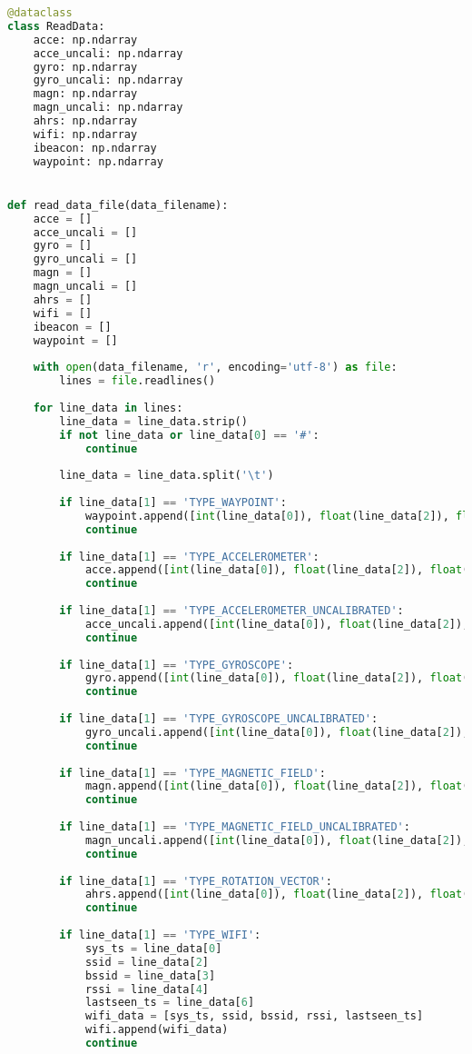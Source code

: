 \documentclass{article}
\begin{document}
\begin{latin}
\begin{lstlisting}[language=Python]
@dataclass
class ReadData:
	acce: np.ndarray
	acce_uncali: np.ndarray
	gyro: np.ndarray
	gyro_uncali: np.ndarray
	magn: np.ndarray
	magn_uncali: np.ndarray
	ahrs: np.ndarray
	wifi: np.ndarray
	ibeacon: np.ndarray
	waypoint: np.ndarray


def read_data_file(data_filename):
	acce = []
	acce_uncali = []
	gyro = []
	gyro_uncali = []
	magn = []
	magn_uncali = []
	ahrs = []
	wifi = []
	ibeacon = []
	waypoint = []
	
	with open(data_filename, 'r', encoding='utf-8') as file:
		lines = file.readlines()
	
	for line_data in lines:
		line_data = line_data.strip()
		if not line_data or line_data[0] == '#':
			continue
	
		line_data = line_data.split('\t')
	
		if line_data[1] == 'TYPE_WAYPOINT':
			waypoint.append([int(line_data[0]), float(line_data[2]), float(line_data[3])])
			continue
	
		if line_data[1] == 'TYPE_ACCELEROMETER':
			acce.append([int(line_data[0]), float(line_data[2]), float(line_data[3]), float(line_data[4])])
			continue
	
		if line_data[1] == 'TYPE_ACCELEROMETER_UNCALIBRATED':
			acce_uncali.append([int(line_data[0]), float(line_data[2]), float(line_data[3]), float(line_data[4])])
			continue
	
		if line_data[1] == 'TYPE_GYROSCOPE':
			gyro.append([int(line_data[0]), float(line_data[2]), float(line_data[3]), float(line_data[4])])
			continue
	
		if line_data[1] == 'TYPE_GYROSCOPE_UNCALIBRATED':
			gyro_uncali.append([int(line_data[0]), float(line_data[2]), float(line_data[3]), float(line_data[4])])
			continue
	
		if line_data[1] == 'TYPE_MAGNETIC_FIELD':
			magn.append([int(line_data[0]), float(line_data[2]), float(line_data[3]), float(line_data[4])])
			continue
	
		if line_data[1] == 'TYPE_MAGNETIC_FIELD_UNCALIBRATED':
			magn_uncali.append([int(line_data[0]), float(line_data[2]), float(line_data[3]), float(line_data[4])])
			continue
	
		if line_data[1] == 'TYPE_ROTATION_VECTOR':
			ahrs.append([int(line_data[0]), float(line_data[2]), float(line_data[3]), float(line_data[4])])
			continue
	
		if line_data[1] == 'TYPE_WIFI':
			sys_ts = line_data[0]
			ssid = line_data[2]
			bssid = line_data[3]
			rssi = line_data[4]
			lastseen_ts = line_data[6]
			wifi_data = [sys_ts, ssid, bssid, rssi, lastseen_ts]
			wifi.append(wifi_data)
			continue
	

\end{lstlisting}
\end{latin}
\end{document}
